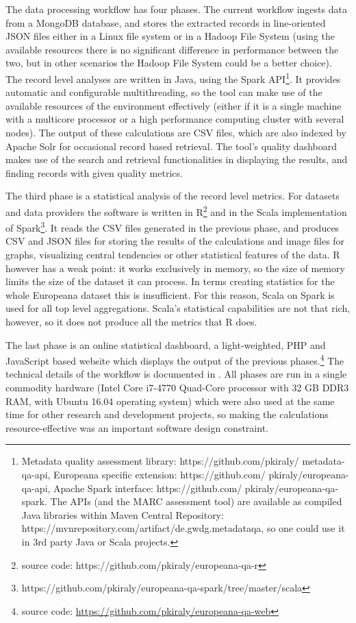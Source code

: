 The data processing workflow has four phases. The current workflow ingests data from a MongoDB database, and stores the extracted records in line-oriented JSON files either in a Linux file system or in a Hadoop File System (using the available resources there is no significant difference in performance between the two, but in other scenarios the Hadoop File System could be a better choice). The record level analyses are written in Java, using the Spark API\footnote{Metadata quality assessment library: https://github.com/pkiraly/ metadata-qa-api, Europeana specific extension: https://github.com/ pkiraly/europeana-qa-api, Apache Spark interface: https://github.com/ pkiraly/europeana-qa-spark. The APIs (and the MARC assessment tool) are available as compiled Java libraries within Maven Central Repository: https://mvnrepository.com/artifact/de.gwdg.metadataqa, so one could use it in 3rd party Java or Scala projects.}. It provides automatic and configurable multithreading, so the tool can make use of the available resources of the environment effectively (either if it is a single machine with a multicore processor or a high performance computing cluster with several nodes). The output of these calculations are CSV files, which are also indexed by Apache Solr for occasional record based retrieval. The tool's quality dashboard makes use of the search and retrieval functionalities in displaying the results, and finding records with given quality metrics. 

The third phase is a statistical analysis of the record level metrics. For datasets and data providers the software is written in R\footnote{source code: https://github.com/pkiraly/europeana-qa-r} and in the Scala implementation of Spark\footnote{https://github.com/pkiraly/europeana-qa-spark/tree/master/scala}. It reads the CSV files generated in the previous phase, and produces CSV and JSON files for storing the results of the calculations and image files for graphs, visualizing central tendencies or other statistical features of the data. R however has a weak point: it works exclusively in memory, so the size of memory limits the size of the dataset it can process. In terms creating statistics for the whole Europeana dataset this is insufficient. For this reason, Scala on Spark is used for all top level aggregations. Scala’s statistical capabilities are not that rich, however, so it does not produce all the metrics that R does.

The last phase is an online statistical dashboard, a light-weighted, PHP and JavaScript based website which displays the output of the previous phases.\footnote{source code: \url{https://github.com/pkiraly/europeana-qa-web}} The technical details of the workflow is documented in \cite{kiraly2015b}. All phases are run in a single commodity hardware (Intel Core i7-4770 Quad-Core processor with 32 GB DDR3 RAM, with Ubuntu 16.04 operating system) which were also used at the same time for other research and development projects, so making the calculations resource-effective was an important software design constraint.

